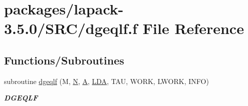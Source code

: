 \hypertarget{dgeqlf_8f}{}\section{packages/lapack-\/3.5.0/\+S\+R\+C/dgeqlf.f File Reference}
\label{dgeqlf_8f}
\subsection*{Functions/\+Subroutines}
\begin{DoxyCompactItemize}
\item 
subroutine \hyperlink{group__doubleGEcomputational_ga0860daeae9b6084202a647418f54af27}{dgeqlf} (M, \hyperlink{polmisc_8c_a0240ac851181b84ac374872dc5434ee4}{N}, \hyperlink{classA}{A}, \hyperlink{example__user_8c_ae946da542ce0db94dced19b2ecefd1aa}{L\+D\+A}, T\+A\+U, W\+O\+R\+K, L\+W\+O\+R\+K, I\+N\+F\+O)
\begin{DoxyCompactList}\small\item\em {\bfseries D\+G\+E\+Q\+L\+F} \end{DoxyCompactList}\end{DoxyCompactItemize}
